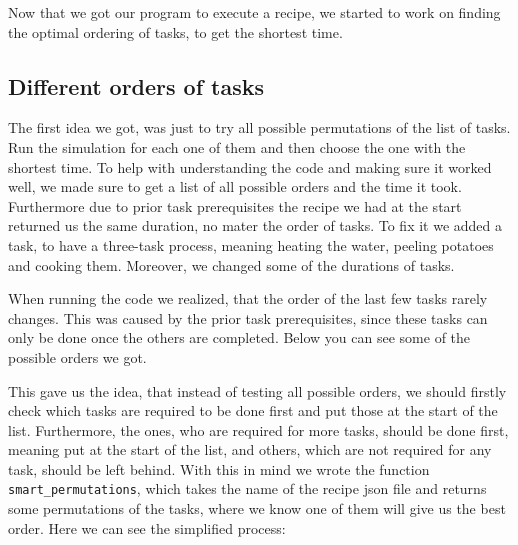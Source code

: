 Now that we got our program to execute a recipe, we started to work on finding the optimal ordering of tasks, to get the shortest time. 

\subsection{Different orders of tasks}
The first idea we got, was just to try all possible permutations of the list of tasks. Run the simulation for each one of them and then choose the one with the shortest time.
To help with understanding the code and making sure it worked well, we made sure to get a list of all possible orders and the time it took. Furthermore due to prior task prerequisites the recipe we had at the start returned us the same duration, no mater the order of tasks. 
To fix it we added a task, to have a three-task process, meaning heating the water, peeling potatoes and cooking them. Moreover, we changed some of the durations of tasks. 

When running the code we realized, that the order of the last few tasks rarely changes. This was caused by the prior task prerequisites, since these tasks can only be done once the others are completed.
Below you can see some of the possible orders we got. 

\begin{verbnobox} 
\end{verbnobox}

This gave us the idea, that instead of testing all possible orders, we should firstly check which tasks are required to be done first and put those at the start of the list. 
Furthermore, the ones, who are required for more tasks, should be done first, meaning put at the start of the list, and others, which are not required for any task, should be left behind.
With this in mind we wrote the function \texttt{smart\_permutations}, which takes the name of the recipe json file and returns some permutations of the tasks, where we know one of them will give us the best order. 
Here we can see the simplified process:

